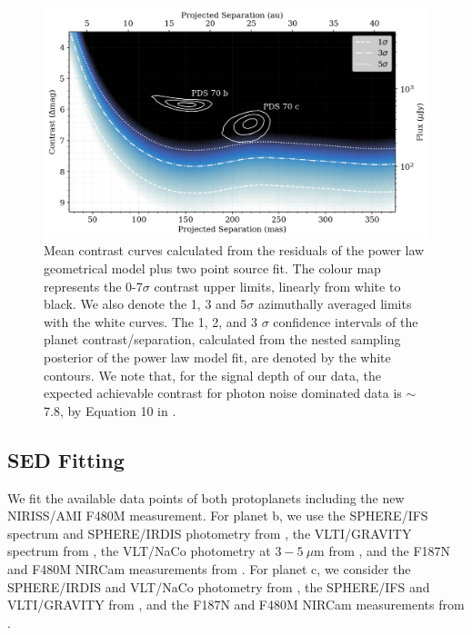 \documentclass[11pt,twocolumn,twocolappendix]{aastex631}
\begin{document}
\begin{figure}
\centering
\includegraphics[width=0.9\linewidth]{f480M_contrast_rev3NEW_Oct18.png}
\caption{Mean contrast curves calculated from the residuals of the {power law} geometrical model plus two point source fit. {The colour map represents the 0-7$\sigma$ contrast upper limits, linearly from white to black. We also denote the 1, 3 and 5$\sigma$ azimuthally averaged limits with the white curves.} %
The 1, 2, and 3 $\sigma$ confidence intervals of the planet contrast/separation, calculated from the nested sampling posterior of the {power law model fit, are denoted by the white contours}. {We note that, for the signal depth of our data, the expected {achievable contrast} for photon noise dominated data is $\sim$7.8, by Equation 10 in \cite{2023PASP..135a5003S}.}}
\label{fig:f480M_cont_cp_corr_im_sub}
\end{figure}

\subsection{SED Fitting}
\label{sec:sed}

We fit the available data points of both protoplanets including the new NIRISS/AMI
F480M measurement. For planet b, we use the SPHERE/IFS spectrum and SPHERE/IRDIS photometry from \cite{2018A&A...617L...2M}, the VLTI/GRAVITY spectrum from \cite{2021AJ....161..148W}, the VLT/NaCo {photometry} at $3-5~\mu$m from \cite{2020A&A...644A..13S}, and the F187N and F480M NIRCam measurements from \cite{2024arXiv240304855C}. For planet c, we consider the SPHERE/IRDIS and VLT/NaCo {photometry} from \cite{2020A&A...644A..13S}, the SPHERE/IFS and VLTI/GRAVITY from \cite{2021AJ....161..148W}, and the F187N and F480M NIRCam measurements from \cite{2024arXiv240304855C}.
\end{document}
